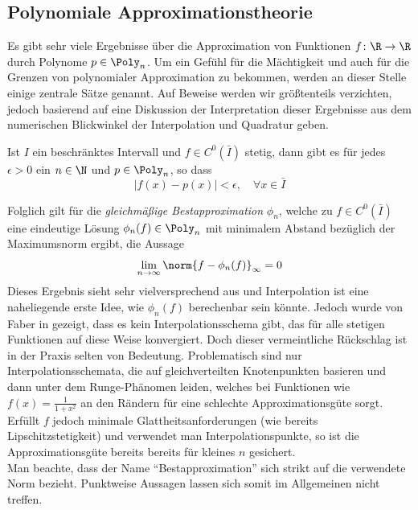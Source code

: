 \subsection{Polynomiale Approximationstheorie}
\label{sec:poly_approx}
Es gibt sehr viele Ergebnisse über die Approximation von Funktionen $f\colon \R\to\R$ durch Polynome $p\in\Poly_n$. Um ein Gefühl für die Mächtigkeit und auch für die Grenzen von polynomialer Approximation zu bekommen, werden an dieser Stelle einige zentrale Sätze genannt. Auf Beweise werden wir größtenteils verzichten, jedoch basierend auf \autocite{Trefethen} eine Diskussion der Interpretation dieser Ergebnisse aus dem numerischen Blickwinkel der Interpolation und Quadratur geben.
\begin{maththeorem}[Weierstrass]
Ist $I$ ein beschränktes Intervall und $f\in C^0(\bar{I})$ stetig, dann gibt es für jedes $\epsilon >0$ ein $n\in\N$ und $p\in\Poly_n$, so dass
\[|f(x)-p(x)|<\epsilon,\quad \forall x\in\bar{I}\]
\end{maththeorem}
Folglich gilt für die \emph{gleichmäßige Bestapproximation} $\phi_n$, welche zu $f\in C^0(\bar{I})$ eine eindeutige Lösung $\phi_n(f)\in\Poly_n$ mit minimalem Abstand bezüglich der Maximumsnorm ergibt, die Aussage
\[\lim\limits_{n\to\infty}\norm{f-\phi_n(f)}_\infty=0\] 
Dieses Ergebnis sieht sehr vielversprechend aus und Interpolation ist eine naheliegende erste Idee, wie $\phi_n(f)$ berechenbar sein könnte. Jedoch wurde von Faber in \autocite{faber14} gezeigt, dass es kein Interpolationsschema gibt, das für alle stetigen Funktionen auf diese Weise konvergiert. Doch dieser vermeintliche Rückschlag ist in der Praxis selten von Bedeutung. Problematisch sind nur Interpolationsschemata, die auf gleichverteilten Knotenpunkten basieren und dann unter dem Runge-Phänomen leiden, welches bei Funktionen wie $f(x)=\frac{1}{1+x^2}$ an den Rändern für eine schlechte Approximationsgüte sorgt. Erfüllt $f$ jedoch minimale Glattheitsanforderungen (wie bereits Lipschitzstetigkeit) und verwendet man \chebyspace Interpolationspunkte, so ist die Approximationsgüte bereits bereits für kleines $n$ gesichert.\\
Man beachte, dass der Name "`Bestapproximation"' sich strikt auf die verwendete Norm bezieht. Punktweise Aussagen lassen sich somit im Allgemeinen nicht treffen. 
